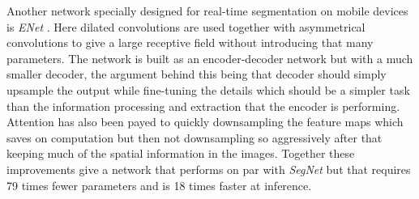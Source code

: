 \documentclass[11pt]{article}
\newcommand{\bibentry}[1]{\cite{#1}}
\begin{document}
Another network specially designed for real-time segmentation on mobile devices is \emph{ENet} \bibentry{paszke2016enet}. Here dilated convolutions are used together with asymmetrical convolutions to give a large receptive field without introducing that many parameters. The network is built as an encoder-decoder network but with a much smaller decoder, the argument behind this being that decoder should simply upsample the output while fine-tuning the details which should be a simpler task than the information processing and extraction that the encoder is performing. Attention has also been payed to quickly downsampling the feature maps which saves on computation but then not downsampling so aggressively after that keeping much of the spatial information in the images. Together these improvements give a network that performs on par with \emph{SegNet} but that requires 79 times fewer parameters and is 18 times faster at inference.


 
\end{document}
